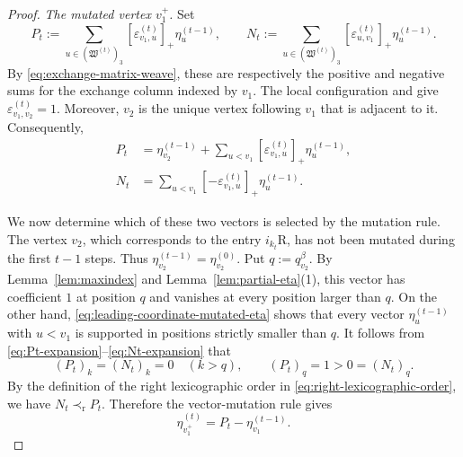 \documentclass[12pt, reqno]{amsart}
\theoremstyle{plain}
\theoremstyle{definition}
\numberwithin{equation}{section}
\begin{document}
\begin{proof}
\smallskip
\noindent
\emph{The mutated vertex \(v_1^+\).}
Set
\begin{equation}\label{eq:positive-negative-vector-sums}
    P_t:=\sum_{u\in(\mathfrak W^{(t)})_3}
       [\varepsilon_{v_1,u}^{(t)}]_+\eta_u^{(t-1)},
    \qquad
    N_t:=\sum_{u\in(\mathfrak W^{(t)})_3}
       [\varepsilon_{u,v_1}^{(t)}]_+\eta_u^{(t-1)}.
\end{equation}
By \eqref{eq:exchange-matrix-weave}, these are respectively the
positive and negative sums for the exchange column indexed by
\(v_1\).
The local configuration and
\cite[Lemma~4.33]{casals2025cluster} give
\(\varepsilon_{v_1,v_2}^{(t)}=1\). Moreover, \(v_2\) is the unique
vertex following \(v_1\) that is adjacent to it. Consequently,
\begin{align}
    P_t&=\eta_{v_2}^{(t-1)}+
        \sum_{u<v_1}[\varepsilon_{v_1,u}^{(t)}]_+
        \eta_u^{(t-1)},\label{eq:Pt-expansion}\\
    N_t&=\sum_{u<v_1}[-\varepsilon_{v_1,u}^{(t)}]_+
        \eta_u^{(t-1)}.\label{eq:Nt-expansion}
\end{align}

We now determine which of these two vectors is selected by the
mutation rule. The vertex \(v_2\), which corresponds to the entry
\(i_{k_t}\mathrm R\), has not been mutated during the first
\(t-1\) steps. Thus
\(\eta_{v_2}^{(t-1)}=\eta_{v_2}^{(0)}\). Put
\(q:=q_{v_2}^\beta\). By
Lemma~\ref{lem:maxindex} and Lemma~\ref{lem:partial-eta}(1), this vector has
coefficient \(1\) at position \(q\) and vanishes at every position
larger than \(q\). On the other hand,
\eqref{eq:leading-coordinate-mutated-eta} shows that every vector
\(\eta_u^{(t-1)}\) with \(u<v_1\) is supported in positions strictly
smaller than \(q\). It follows from
\eqref{eq:Pt-expansion}--\eqref{eq:Nt-expansion} that
\begin{equation}\label{eq:right-order-comparison-Pt-Nt}
    (P_t)_k=(N_t)_k=0\quad(k>q),
    \qquad
    (P_t)_q=1>0=(N_t)_q.
\end{equation}
By the definition of the right lexicographic order in
\eqref{eq:right-lexicographic-order}, we have
\(N_t\prec_{\mathrm r}P_t\). Therefore the vector-mutation rule gives
\begin{equation}\label{eq:mutated-vector-Pt}
    \eta_{v_1^+}^{(t)}=P_t-\eta_{v_1}^{(t-1)}.
\end{equation}


\end{proof}
\end{document}
